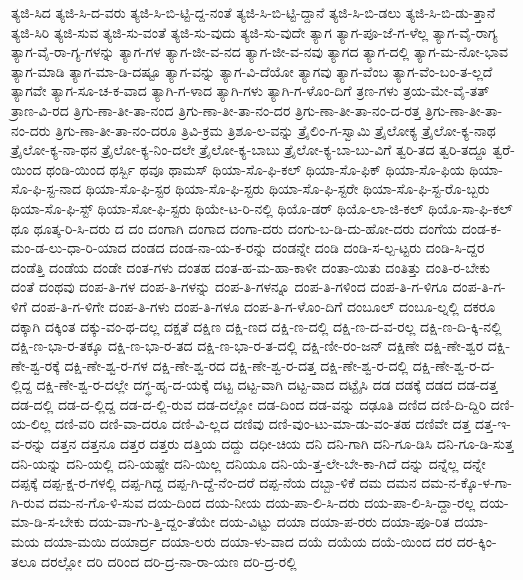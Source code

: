 {ತ್ಯಜಿ-ಸಿದ
ತ್ಯಜಿ-ಸಿ-ದ-ವರು
ತ್ಯಜಿ-ಸಿ-ಬಿ-ಟ್ಟಿ-ದ್ದ-ನಂತೆ
ತ್ಯಜಿ-ಸಿ-ಬಿ-ಟ್ಟಿ-ದ್ದಾನೆ
ತ್ಯಜಿ-ಸಿ-ಬಿ-ಡಲು
ತ್ಯಜಿ-ಸಿ-ಬಿ-ಡು-ತ್ತಾನೆ
ತ್ಯಜಿ-ಸಿರಿ
ತ್ಯಜಿ-ಸುವ
ತ್ಯಜಿ-ಸು-ವಂತೆ
ತ್ಯಜಿ-ಸು-ವುದು
ತ್ಯಜಿ-ಸು-ವುದೇ
ತ್ಯಾಗ
ತ್ಯಾಗ-ಪೂ-ಜೆ-ಗ-ಳೆಲ್ಲ
ತ್ಯಾಗ-ವೈ-ರಾಗ್ಯ
ತ್ಯಾಗ-ವೈ-ರಾ-ಗ್ಯ-ಗಳನ್ನು
ತ್ಯಾಗ-ಗಳ
ತ್ಯಾಗ-ಜೀ-ವ-ನದ
ತ್ಯಾಗ-ಜೀ-ವ-ನವು
ತ್ಯಾಗದ
ತ್ಯಾಗ-ದಲ್ಲಿ
ತ್ಯಾಗ-ಮ-ನೋ-ಭಾವ
ತ್ಯಾಗ-ಮಾಡಿ
ತ್ಯಾಗ-ಮಾ-ಡಿ-ದಷ್ಟೂ
ತ್ಯಾಗ-ವನ್ನು
ತ್ಯಾಗ-ವಿ-ದೆಯೋ
ತ್ಯಾಗವು
ತ್ಯಾಗ-ವೆಂಬ
ತ್ಯಾಗ-ವೆಂ-ಬಂ-ತ-ಲ್ಲದೆ
ತ್ಯಾಗವೇ
ತ್ಯಾಗ-ಸೂ-ಚ-ಕ-ವಾದ
ತ್ಯಾಗಿ-ಗ-ಳಾದ
ತ್ಯಾಗಿ-ಗಳು
ತ್ಯಾಗಿ-ಗ-ಳೊಂ-ದಿಗೆ
ತ್ರಣ-ಗಳು
ತ್ರಯ-ಮೇ-ವೈ-ತತ್
ತ್ರಾಣ-ವಿ-ರದ
ತ್ರಿಗು-ಣಾ-ತೀ-ತಾ-ನಂದ
ತ್ರಿಗು-ಣಾ-ತೀ-ತಾ-ನಂ-ದರ
ತ್ರಿಗು-ಣಾ-ತೀ-ತಾ-ನಂ-ದ-ರತ್ತ
ತ್ರಿಗು-ಣಾ-ತೀ-ತಾ-ನಂ-ದರು
ತ್ರಿಗು-ಣಾ-ತೀ-ತಾ-ನಂ-ದರೂ
ತ್ರಿವಿ-ಕ್ರಮ
ತ್ರಿಶೂ-ಲ-ವನ್ನು
ತ್ರೈಲಿಂ-ಗ-ಸ್ವಾಮಿ
ತ್ರೈಲೋಕ್ಯ
ತ್ರೈಲೋ-ಕ್ಯ-ನಾಥ
ತ್ರೈಲೋ-ಕ್ಯ-ನಾ-ಥನ
ತ್ರೈಲೋ-ಕ್ಯ-ನಿಂ-ದಲೇ
ತ್ರೈಲೋ-ಕ್ಯ-ಬಾಬು
ತ್ರೈಲೋ-ಕ್ಯ-ಬಾ-ಬು-ವಿಗೆ
ತ್ವರಿ-ತದ
ತ್ವರಿ-ತದ್ದೂ
ತ್ವರೆ-ಯಿಂದ
ಥಂಡಿ-ಯಿಂದ
ಥರ್ಸ್ಬಿ
ಥವೂ
ಥಾಮಸ್
ಥಿಯಾ-ಸೊ-ಫಿ-ಕಲ್
ಥಿಯಾ-ಸೊ-ಫಿಕ್
ಥಿಯಾ-ಸೊ-ಫಿಯ
ಥಿಯಾ-ಸೊ-ಫಿ-ಸ್ಟ-ನಾದ
ಥಿಯಾ-ಸೊ-ಫಿ-ಸ್ಟರ
ಥಿಯಾ-ಸೊ-ಫಿ-ಸ್ಟರು
ಥಿಯಾ-ಸೊ-ಫಿ-ಸ್ಟರೇ
ಥಿಯಾ-ಸೊ-ಫಿ-ಸ್ಟ-ರೊ-ಬ್ಬರು
ಥಿಯಾ-ಸೊ-ಫಿ-ಸ್ಟ್
ಥಿಯಾ-ಸೋ-ಫಿ-ಸ್ಟರು
ಥಿಯೇ-ಟ-ರಿ-ನಲ್ಲಿ
ಥಿಯೊ-ಡರ್
ಥಿಯೊ-ಲಾ-ಜಿ-ಕಲ್
ಥಿಯೊ-ಸಾ-ಫಿ-ಕಲ್
ಥೂ
ಥೂತ್ಕ-ರಿ-ಸಿ-ದರು
ದ
ದಂ
ದಂಗಾಗಿ
ದಂಗಾದ
ದಂಗಾ-ದರು
ದಂಗು-ಬ-ಡಿ-ದು-ಹೋ-ದರು
ದಂಗೆಯ
ದಂಡ-ಕ-ಮಂ-ಡ-ಲು-ಧಾ-ರಿ-ಯಾದ
ದಂಡದ
ದಂಡ-ನಾ-ಯ-ಕ-ರನ್ನು
ದಂಡನ್ನೇ
ದಂಡಿ
ದಂಡಿ-ಸ-ಲ್ಪ-ಟ್ಟರು
ದಂಡಿ-ಸಿ-ದ್ದರ
ದಂಡೆತ್ತಿ
ದಂಡೆಯ
ದಂಡೇ
ದಂತ-ಗಳು
ದಂತಹ
ದಂತ-ಹ-ಮ-ಹಾ-ಕಾಳೀ
ದಂತಾ-ಯಿತು
ದಂತಿತ್ತು
ದಂತಿ-ರ-ಬೇಕು
ದಂತೆ
ದಂಥವು
ದಂಪ-ತಿ-ಗಳ
ದಂಪ-ತಿ-ಗಳನ್ನು
ದಂಪ-ತಿ-ಗಳನ್ನೂ
ದಂಪ-ತಿ-ಗಳಿಂದ
ದಂಪ-ತಿ-ಗ-ಳಿಗೂ
ದಂಪ-ತಿ-ಗ-ಳಿಗೆ
ದಂಪ-ತಿ-ಗ-ಳಿಗೇ
ದಂಪ-ತಿ-ಗಳು
ದಂಪ-ತಿ-ಗಳೂ
ದಂಪ-ತಿ-ಗ-ಳೊಂ-ದಿಗೆ
ದಂಬೂಲ್
ದಂಬೂ-ಲ್ನಲ್ಲಿ
ದಕರೂ
ದಕ್ಕಾಗಿ
ದಕ್ಕಿಂತ
ದಕ್ಕು-ವಂ-ಥ-ದಲ್ಲ
ದಕ್ಷತೆ
ದಕ್ಷಿಣ
ದಕ್ಷಿ-ಣದ
ದಕ್ಷಿ-ಣ-ದಲ್ಲಿ
ದಕ್ಷಿ-ಣ-ದ-ವ-ರಲ್ಲ
ದಕ್ಷಿ-ಣ-ದಿ-ಕ್ಕಿ-ನಲ್ಲಿ
ದಕ್ಷಿ-ಣ-ಭಾ-ರ-ತಕ್ಕೂ
ದಕ್ಷಿ-ಣ-ಭಾ-ರ-ತದ
ದಕ್ಷಿ-ಣ-ಭಾ-ರ-ತ-ದಲ್ಲಿ
ದಕ್ಷಿ-ಣೀ-ರಂ-ಜನ್
ದಕ್ಷಿಣೇ
ದಕ್ಷಿ-ಣೇ-ಶ್ವರ
ದಕ್ಷಿ-ಣೇ-ಶ್ವ-ರಕ್ಕೆ
ದಕ್ಷಿ-ಣೇ-ಶ್ವ-ರ-ಗಳ
ದಕ್ಷಿ-ಣೇ-ಶ್ವ-ರದ
ದಕ್ಷಿ-ಣೇ-ಶ್ವ-ರ-ದತ್ತ
ದಕ್ಷಿ-ಣೇ-ಶ್ವ-ರ-ದಲ್ಲಿ
ದಕ್ಷಿ-ಣೇ-ಶ್ವ-ರ-ದ-ಲ್ಲಿದ್ದ
ದಕ್ಷಿ-ಣೇ-ಶ್ವ-ರ-ದಲ್ಲೇ
ದಗ್ಧ-ಹೃ-ದ-ಯಕ್ಕೆ
ದಟ್ಟ
ದಟ್ಟ-ವಾಗಿ
ದಟ್ಟ-ವಾದ
ದಟ್ಟೈಸಿ
ದಡ
ದಡಕ್ಕೆ
ದಡದ
ದಡ-ದತ್ತ
ದಡ-ದಲ್ಲಿ
ದಡ-ದ-ಲ್ಲಿದ್ದ
ದಡ-ದ-ಲ್ಲಿ-ರುವ
ದಡ-ದಲ್ಲೋ
ದಡ-ದಿಂದ
ದಡ-ವನ್ನು
ದಢೂತಿ
ದಣಿದ
ದಣಿ-ದಿ-ದ್ದಿರಿ
ದಣಿ-ಯ-ಲಿಲ್ಲ
ದಣಿ-ವರಿ
ದಣಿ-ವಾ-ದರೂ
ದಣಿ-ವಿ-ಲ್ಲದ
ದಣಿವು
ದಣಿ-ವುಂ-ಟು-ಮಾ-ಡು-ವಂ-ತಹ
ದಣಿವೇ
ದತ್ತ
ದತ್ತ-ಇ-ವ-ರನ್ನು
ದತ್ತನ
ದತ್ತನೂ
ದತ್ತರ
ದತ್ತರು
ದತ್ತಿಯ
ದದ್ದು
ದಧೀ-ಚಿಯ
ದನಿ
ದನಿ-ಗಾಗಿ
ದನಿ-ಗೂ-ಡಿಸಿ
ದನಿ-ಗೂ-ಡಿ-ಸುತ್ತ
ದನಿ-ಯನ್ನು
ದನಿ-ಯಲ್ಲಿ
ದನಿ-ಯಷ್ಟೇ
ದನಿ-ಯಿಲ್ಲ
ದನಿಯೂ
ದನಿ-ಯೆ-ತ್ತ-ಲೇ-ಬೇ-ಕಾ-ಗಿದೆ
ದನ್ನು
ದನ್ನೆಲ್ಲ
ದನ್ನೇ
ದಪ್ಪಕ್ಕೆ
ದಪ್ಪ-ಕ್ಷ-ರ-ಗಳಲ್ಲಿ
ದಪ್ಪ-ಗಿದ್ದ
ದಪ್ಪ-ಗಿ-ದ್ದೆ-ನೆಂ-ದರೆ
ದಪ್ಪ-ನೆಯ
ದಬ್ಬಾ-ಳಿಕೆ
ದಮ
ದಮನ
ದಮ-ನ-ಕ್ಕೊ-ಳ-ಗಾ-ಗಿ-ರುವ
ದಮ-ನ-ಗೊ-ಳಿ-ಸುವ
ದಯ-ದಿಂದ
ದಯ-ನೀಯ
ದಯ-ಪಾ-ಲಿ-ಸಿ-ದರು
ದಯ-ಪಾ-ಲಿ-ಸಿ-ದ್ದಾ-ರಲ್ಲ
ದಯ-ಮಾ-ಡಿ-ಸ-ಬೇಕು
ದಯ-ವಾ-ಗು-ತ್ತಿ-ದ್ದಂ-ತೆಯೇ
ದಯ-ವಿಟ್ಟು
ದಯಾ
ದಯಾ-ಪ-ರರು
ದಯಾ-ಪೂ-ರಿತ
ದಯಾ-ಮಯ
ದಯಾ-ಮಯಿ
ದಯಾರ್ದ್ರ
ದಯಾ-ಲರು
ದಯಾ-ಳು-ವಾದ
ದಯೆ
ದಯೆಯ
ದಯೆ-ಯಿಂದ
ದರ
ದರ-ಕ್ಕಿಂ-ತಲೂ
ದರಲ್ಲೋ
ದರಿ
ದರಿಂದ
ದರಿ-ದ್ರ-ನಾ-ರಾ-ಯಣ
ದರಿ-ದ್ರ-ರಲ್ಲಿ
}
